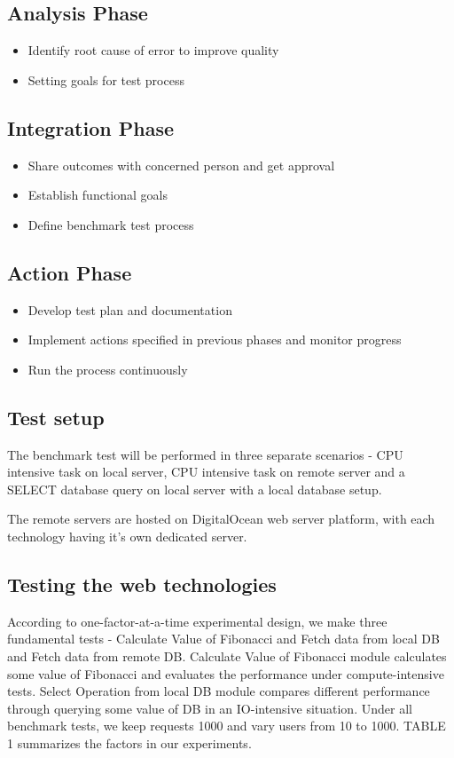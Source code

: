 \documentclass[../thesis.tex]{subfiles}
\begin{document}
	\subsection*{Analysis Phase}
	\begin{itemize}
		\item Identify root cause of error to improve quality
		\item Setting goals for test process
	\end{itemize}
	\subsection*{Integration Phase}
	\begin{itemize}
		\item Share outcomes with concerned person and get approval
		\item Establish functional goals
		\item Define benchmark test process
	\end{itemize}
	\subsection*{Action Phase}
	\begin{itemize}
		\item Develop test plan and documentation
		\item Implement actions specified in previous phases and monitor progress
		\item Run the process continuously
	\end{itemize}
	
	\subsection{Test setup}
	The benchmark test will be performed in three separate scenarios - CPU intensive task on local server, CPU intensive task on remote server and a SELECT database query on local server with a local database setup.
	
	The remote servers are hosted on DigitalOcean web server platform, with each technology having it's own dedicated server.
	
	\subsection{Testing the web technologies}
	According to one-factor-at-a-time experimental design, we make three fundamental tests - Calculate Value of Fibonacci and Fetch data from local DB and Fetch data from remote DB. Calculate Value of Fibonacci module calculates some value of Fibonacci and evaluates the performance under compute-intensive tests. Select Operation from local DB module compares different performance through querying some value of DB in an IO-intensive situation. Under all benchmark tests, we keep requests 1000 and vary users from 10 to 1000. TABLE 1 summarizes the factors in our experiments.
	
\end{document}

